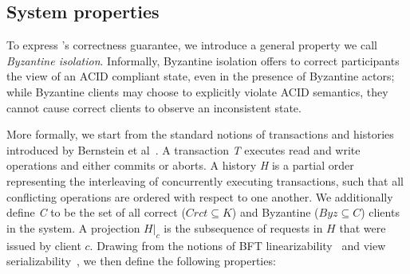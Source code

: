 \subsection{System properties}
To express \sys's correctness guarantee, we introduce a general property we call  {\em Byzantine isolation}. Informally, Byzantine isolation offers to correct participants the view of an ACID compliant state, even in the presence of Byzantine actors;  while Byzantine clients may choose to explicitly violate ACID semantics, they cannot cause correct clients to observe an inconsistent state.  


More formally, we start from  the standard notions of transactions and histories introduced by Bernstein et al~\cite{bernstein1987concurrency}. A transaction \textit{T} executes read and write operations and either commits or aborts. A history \textit{H} is a partial order representing the interleaving of concurrently executing transactions, such that all conflicting operations are ordered with respect to one another. We additionally define \textit{C} to be the set of all correct ($Crct \subseteq K$) and Byzantine ($Byz \subseteq C$) clients in the system.
A projection $H|_{c}$ is the subsequence of requests in $H$ that were issued by client $c$. Drawing from the notions of BFT linearizability~\cite{liskov2006tolerating} and view serializability~\cite{bernstein1987concurrency}, we then define the following properties:


